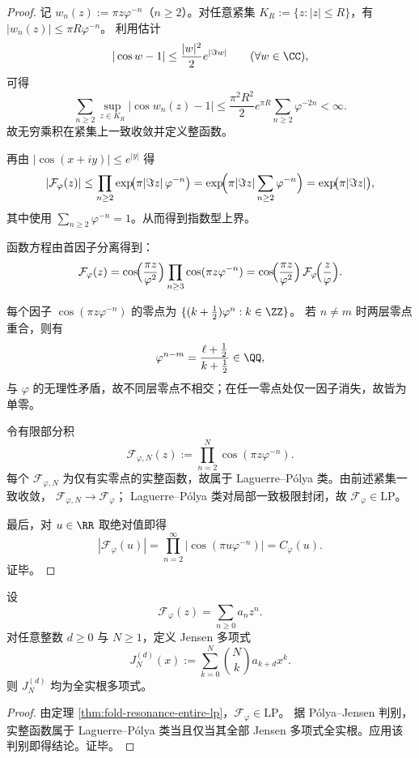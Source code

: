 \begin{proof}
记 \(w_n(z):=\pi z\varphi^{-n}\)（\(n\ge 2\)）。对任意紧集 \(K_R:=\{z:|z|\le R\}\)，有
\(
|w_n(z)|\le \pi R\varphi^{-n}
\)。
利用估计
\[
|\cos w-1|\le \frac{|w|^2}{2}e^{|\Im w|}\qquad(\forall w\in\CC),
\]
可得
\[
\sum_{n\ge 2}\sup_{z\in K_R}|\cos w_n(z)-1|
\le
\frac{\pi^2R^2}{2}e^{\pi R}\sum_{n\ge 2}\varphi^{-2n}<\infty.
\]
故无穷乘积在紧集上一致收敛并定义整函数。

再由 \(|\cos(x+iy)|\le e^{|y|}\) 得
\[
|\mathcal{F}_\varphi(z)|
\le
\prod_{n\ge 2}\exp\!\bigl(\pi|\Im z|\,\varphi^{-n}\bigr)
=
\exp\!\Bigl(\pi|\Im z|\sum_{n\ge 2}\varphi^{-n}\Bigr)
=\exp\!\bigl(\pi|\Im z|\bigr),
\]
其中使用 \(\sum_{n\ge 2}\varphi^{-n}=1\)。从而得到指数型上界。

函数方程由首因子分离得到：
\[
\mathcal{F}_\varphi(z)
=
\cos\!\Bigl(\frac{\pi z}{\varphi^2}\Bigr)\prod_{n\ge 3}\cos(\pi z\varphi^{-n})
=
\cos\!\Bigl(\frac{\pi z}{\varphi^2}\Bigr)\,\mathcal{F}_\varphi\!\Bigl(\frac{z}{\varphi}\Bigr).
\]

每个因子 \(\cos(\pi z\varphi^{-n})\) 的零点为 \(\{(k+\tfrac12)\varphi^n:k\in\ZZ\}\)。
若 \(n\neq m\) 时两层零点重合，则有
\[
\varphi^{n-m}=\frac{\ell+\tfrac12}{k+\tfrac12}\in\QQ,
\]
与 \(\varphi\) 的无理性矛盾，故不同层零点不相交；在任一零点处仅一因子消失，故皆为单零。

令有限部分积
\[
\mathcal{F}_{\varphi,N}(z):=\prod_{n=2}^{N}\cos(\pi z\varphi^{-n}).
\]
每个 \(\mathcal{F}_{\varphi,N}\) 为仅有实零点的实整函数，故属于 Laguerre--P\'olya 类。由前述紧集一致收敛，
\(\mathcal{F}_{\varphi,N}\to\mathcal{F}_\varphi\)；
Laguerre--P\'olya 类对局部一致极限封闭，故 \(\mathcal{F}_\varphi\in\mathrm{LP}\)。

最后，对 \(u\in\RR\) 取绝对值即得
\[
|\mathcal{F}_\varphi(u)|
=
\prod_{n=2}^{\infty}|\cos(\pi u\varphi^{-n})|
=
C_\varphi(u).
\]
证毕。
\end{proof}

\begin{corollary}\label{cor:fold-resonance-jensen-hyperbolicity}
设
\[
\mathcal{F}_\varphi(z)=\sum_{n\ge 0}a_n z^n.
\]
对任意整数 \(d\ge 0\) 与 \(N\ge 1\)，定义 Jensen 多项式
\[
J_N^{(d)}(x):=\sum_{k=0}^{N}\binom{N}{k}a_{k+d}x^k.
\]
则 \(J_N^{(d)}\) 均为全实根多项式。
\end{corollary}

\begin{proof}
由定理 \ref{thm:fold-resonance-entire-lp}，\(\mathcal{F}_\varphi\in\mathrm{LP}\)。
据 P\'olya--Jensen 判别，实整函数属于 Laguerre--P\'olya 类当且仅当其全部 Jensen 多项式全实根。应用该判别即得结论。证毕。
\end{proof}


